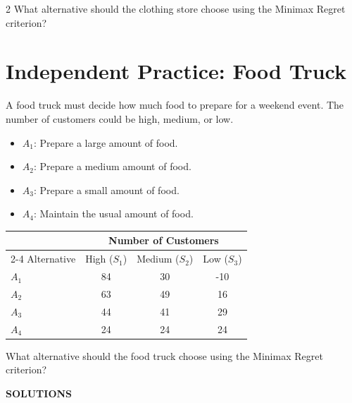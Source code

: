 \begin{multicols}{2}
	What alternative should the clothing store choose using the Minimax Regret criterion?
	
	
	\section{Independent Practice: Food Truck}
	
	A food truck must decide how much food to prepare for a weekend event.
	The number of customers could be high, medium, or low.
	\begin{itemize}
		\item $A_1$: Prepare a large amount of food.
		\item $A_2$: Prepare a medium amount of food.
		\item $A_3$: Prepare a small amount of food.
		\item $A_4$: Maintain the usual amount of food.
	\end{itemize}
	\begin{center}
		\renewcommand{\arraystretch}{1.3}
		\small
		\begin{tabular}{lccc}
			\toprule
			& \multicolumn{3}{c}{Number of Customers} \\
			\cmidrule(lr){2-4}
			Alternative & High ($S_1$) & Medium ($S_2$) & Low ($S_3$) \\
			\midrule
			$A_1$ & 84 & 30 & -10 \\
			$A_2$ & 63 & 49 & 16 \\
			$A_3$ & 44 & 41 & 29 \\
			$A_4$ & 24 & 24 & 24 \\
			\bottomrule
		\end{tabular}
	\end{center}
	
	What alternative should the food truck choose using the Minimax Regret criterion?
		
	\end{multicols}
	
	\newpage 
	\begin{center}
		\huge \textbf{SOLUTIONS}
	\end{center}
	
